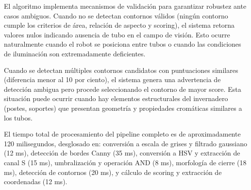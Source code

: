 El algoritmo implementa mecanismos de validación para garantizar robustez ante casos ambiguos. Cuando no se detectan contornos válidos (ningún contorno cumple los criterios de área, relación de aspecto y scoring), el sistema retorna valores nulos indicando ausencia de tubo en el campo de visión. Esto ocurre naturalmente cuando el robot se posiciona entre tubos o cuando las condiciones de iluminación son extremadamente deficientes.

Cuando se detectan múltiples contornos candidatos con puntuaciones similares (diferencia menor al 10 por ciento), el sistema genera una advertencia de detección ambigua pero procede seleccionando el contorno de mayor score. Esta situación puede ocurrir cuando hay elementos estructurales del invernadero (postes, soportes) que presentan geometría y propiedades cromáticas similares a los tubos.

El tiempo total de procesamiento del pipeline completo es de aproximadamente 120 milisegundos, desglosado en: conversión a escala de grises y filtrado gaussiano (12 ms), detección de bordes Canny (35 ms), conversión a HSV y extracción de canal S (15 ms), umbralización y operación AND (8 ms), morfología de cierre (18 ms), detección de contornos (20 ms), y cálculo de scoring y extracción de coordenadas (12 ms).
